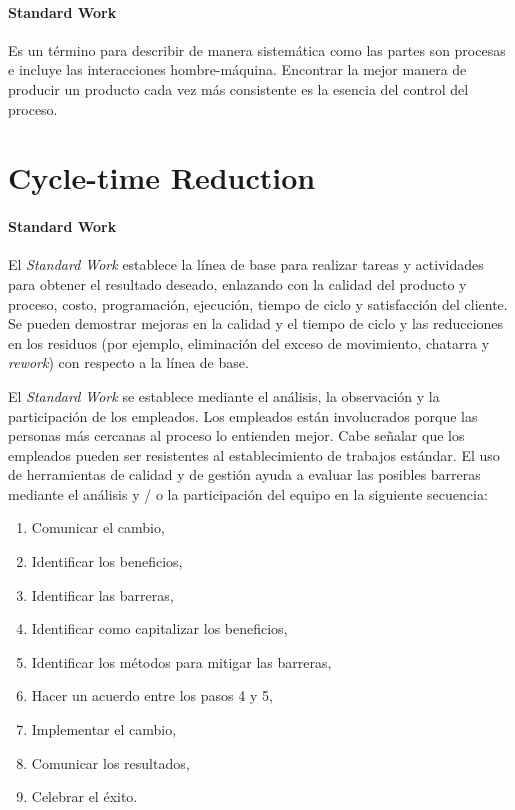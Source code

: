 \documentclass[oneside]{book}
\begin{document}
\paragraph{Standard Work}
Es un término para describir de manera sistemática como las partes son procesas e incluye las interacciones hombre-máquina. Encontrar la mejor manera de producir un producto cada vez más consistente es la esencia del control del proceso.

\section{Cycle-time Reduction}

\paragraph{Standard Work}
El \textit{Standard Work} establece la línea de base para realizar tareas y actividades para obtener el resultado deseado, enlazando con la calidad del producto y proceso, costo, programación, ejecución, tiempo de ciclo y satisfacción del cliente. Se pueden demostrar mejoras en la calidad y el tiempo de ciclo y las reducciones en los residuos (por ejemplo, eliminación del exceso de movimiento, chatarra y \textit{rework}) con respecto a la línea de base.

El \textit{Standard Work} se establece mediante el análisis, la observación y la participación de los empleados. Los empleados están involucrados porque las personas más cercanas al proceso lo entienden mejor. Cabe señalar que los empleados pueden ser resistentes al establecimiento de trabajos estándar. El uso de herramientas de calidad y de gestión ayuda a evaluar las posibles barreras mediante el análisis y / o la participación del equipo en la siguiente secuencia:

\begin{enumerate}
	\item Comunicar el cambio,
	\item Identificar los beneficios,
	\item Identificar las barreras,
	\item Identificar como capitalizar los beneficios,
	\item Identificar los métodos para mitigar las barreras,
	\item Hacer un acuerdo entre los pasos 4 y 5,
	\item Implementar el cambio,
	\item Comunicar los resultados,
	\item Celebrar el éxito.
\end{enumerate}
\end{document}
